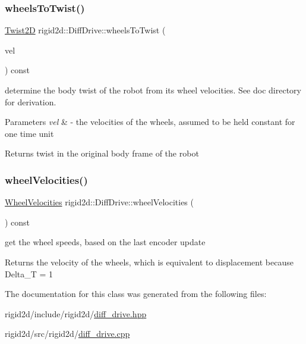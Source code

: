 \subsubsection{\texorpdfstring{wheels\+To\+Twist()}{wheelsToTwist()}}
{\footnotesize\ttfamily \hyperlink{structrigid2d_1_1Twist2D}{Twist2D} rigid2d\+::\+Diff\+Drive\+::wheels\+To\+Twist (\begin{DoxyParamCaption}\item[{\hyperlink{structrigid2d_1_1WheelVelocities}{Wheel\+Velocities}}]{vel }\end{DoxyParamCaption}) const}



determine the body twist of the robot from its wheel velocities. See doc directory for derivation. 


\begin{DoxyParams}{Parameters}
{\em vel} & -\/ the velocities of the wheels, assumed to be held constant for one time unit \\
\hline
\end{DoxyParams}
\begin{DoxyReturn}{Returns}
twist in the original body frame of the robot 
\end{DoxyReturn}
\mbox{\label{classrigid2d_1_1DiffDrive_a4153bdc614be0535b88d5e43461df7dc}} 
\subsubsection{\texorpdfstring{wheel\+Velocities()}{wheelVelocities()}}
{\footnotesize\ttfamily \hyperlink{structrigid2d_1_1WheelVelocities}{Wheel\+Velocities} rigid2d\+::\+Diff\+Drive\+::wheel\+Velocities (\begin{DoxyParamCaption}{ }\end{DoxyParamCaption}) const}



get the wheel speeds, based on the last encoder update 

\begin{DoxyReturn}{Returns}
the velocity of the wheels, which is equivalent to displacement because Delta\+\_\+T = 1 
\end{DoxyReturn}


The documentation for this class was generated from the following files\+:\begin{DoxyCompactItemize}
\item 
rigid2d/include/rigid2d/\hyperlink{diff__drive_8hpp}{diff\+\_\+drive.\+hpp}\item 
rigid2d/src/rigid2d/\hyperlink{diff__drive_8cpp}{diff\+\_\+drive.\+cpp}\end{DoxyCompactItemize}
